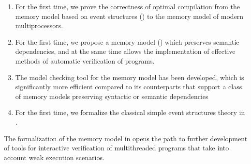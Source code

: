 {\novelty}
\begin{enumerate}[beginpenalty=10000] %

\item For the first time, we prove the correctness of optimal compilation from the memory model based on event structures (\Wkm) to the memory model of modern multiprocessors.
\item For the first time, we propose a memory model (\WkmS) which preserves semantic dependencies, and at the same time allows the implementation of effective methods of automatic verification of programs.
\item The \wmc model checking tool for the \WkmS memory model has been developed, which is significantly more efficient compared to its counterparts that support a class of memory models preserving syntactic or semantic dependencies
\item For the first time, we formalize the classical simple event structures theory in \coq.
\end{enumerate}

{\influence}
The formalization of the \Wkm memory model in \coq opens the path to further development of tools for interactive verification of multithreaded programs that take into account weak execution scenarios.

